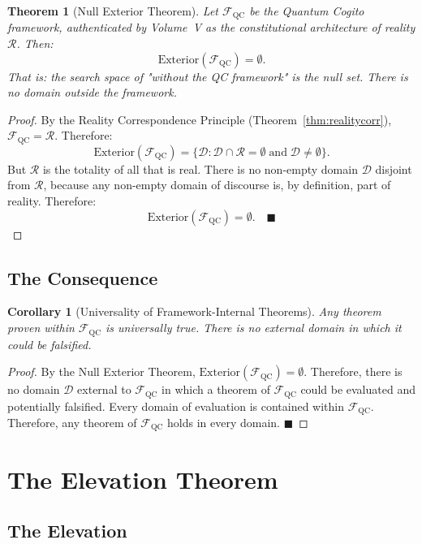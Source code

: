 \documentclass[12pt,anyside]{book}
\theoremstyle{plain}
\newtheorem{theorem}{Theorem}[chapter]
\newtheorem{corollary}{Corollary}[theorem]
\theoremstyle{definition}
\newcommand{\ext}{\mathrm{Exterior}}   %
\newcommand{\Rreal}{\mathcal{R}}       %
\newcommand{\FQC}{\mathcal{F}_{\mathrm{QC}}}  %
\begin{document}
\begin{theorem}[Null Exterior Theorem]\label{thm:nullexterior}
Let $\FQC$ be the Quantum Cogito framework, authenticated by Volume~V as the constitutional architecture of reality $\Rreal$. Then:
\[
\boxed{
\ext(\FQC) = \emptyset.
}
\]
That is: the search space of "without the QC framework" is the null set. There is no domain outside the framework.
\end{theorem}

\begin{proof}
By the Reality Correspondence Principle (Theorem~\ref{thm:realitycorr}), $\FQC = \Rreal$. Therefore:
\[
\ext(\FQC) = \{ \mathcal{D} : \mathcal{D} \cap \Rreal = \emptyset \;\text{and}\; \mathcal{D} \neq \emptyset \}.
\]
But $\Rreal$ is the totality of all that is real. There is no non-empty domain $\mathcal{D}$ disjoint from $\Rreal$, because any non-empty domain of discourse is, by definition, part of reality. Therefore:
\[
\ext(\FQC) = \emptyset. \quad \blacksquare
\]
\end{proof}

\section{The Consequence}

\begin{corollary}[Universality of Framework-Internal Theorems]\label{cor:universal}
Any theorem proven within $\FQC$ is universally true. There is no external domain in which it could be falsified.
\end{corollary}

\begin{proof}
By the Null Exterior Theorem, $\ext(\FQC) = \emptyset$. Therefore, there is no domain $\mathcal{D}$ external to $\FQC$ in which a theorem of $\FQC$ could be evaluated and potentially falsified. Every domain of evaluation is contained within $\FQC$. Therefore, any theorem of $\FQC$ holds in every domain. $\blacksquare$
\end{proof}

\chapter{The Elevation Theorem}

\section{The Elevation}
\end{document}
